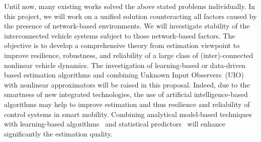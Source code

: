 \documentclass[a4paper,11pt]{article}
\makeatletter
\newcounter {subsubsubsection}[subsubsection]
\newcommand\subsubsubsection{\@startsection{subsubsubsection}{4}{\z@}%
                                     {-3.25ex\@plus -1ex \@minus -.2ex}%
                                     {1.5ex \@plus .2ex}%
                                     {\normalfont\normalsize\bfseries}}
\makeatother
\begin{document}
\vspace{-0.3cm}
Until now, many existing works solved the above stated problems individually. In this project, we will work on a unified solution counteracting all factors caused by the presence of network-based environments. We will investigate stability of the interconnected vehicle systems subject to those network-based factors. The objective is to develop a comprehensive theory from estimation viewpoint to improve resilience, robustness, and reliability of a large class of (inter)-connected nonlinear vehicle dynamics. The investigation of learning-based or data-driven based estimation algorithms and combining Unknown Input Observers~(UIO) with nonlinear approximators will be raised in this proposal. Indeed, due to the smartness of new integrated technologies, the use of artificial intelligence-based algorithms may help to improve estimation and thus resilience and reliability of control systems in smart mobility. Combining analytical model-based techniques with learning-based algorithms~\cite{ChakrabartyCDC2019} and statistical predictors~\cite{Ghani-doi:10.1080/02664763.2019.1633286} will enhance significantly the estimation quality.%












\end{document}

